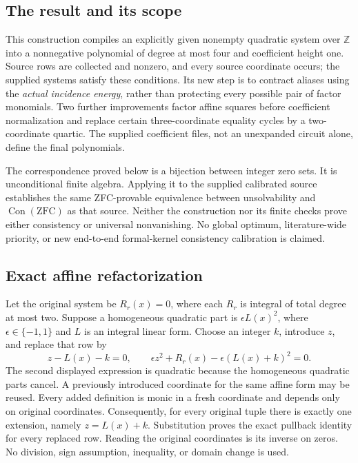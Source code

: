 \subsection{The result and its scope}
This construction compiles an explicitly given nonempty quadratic system over
\(\mathbb Z\) into a nonnegative polynomial of degree at most four and
coefficient height one. Source rows are collected and nonzero, and every
source coordinate occurs; the supplied systems satisfy these conditions. Its
new step is to contract aliases using the \emph{actual incidence energy},
rather than protecting every possible pair of factor monomials. Two further
improvements factor affine squares before coefficient normalization and
replace certain three-coordinate equality cycles by a two-coordinate
quartic. The supplied coefficient files, not an unexpanded circuit alone,
define the final polynomials.

The correspondence proved below is a bijection between integer zero sets.
It is unconditional finite algebra. Applying it to the supplied calibrated
source establishes the same ZFC-provable equivalence between unsolvability
and \(\operatorname{Con}(\mathrm{ZFC})\) as that source. Neither the
construction nor its finite checks prove either consistency or universal
nonvanishing. No global optimum, literature-wide priority, or new
end-to-end formal-kernel consistency calibration is claimed.

\subsection{Exact affine refactorization}
Let the original system be \(R_r(x)=0\), where each \(R_r\) is integral
of total degree at most two. Suppose a homogeneous quadratic part is
\(\epsilon L(x)^2\), where \(\epsilon\in\{-1,1\}\) and \(L\) is
an integral linear form. Choose an integer \(k\), introduce \(z\), and
replace that row by
\[
 z-L(x)-k=0,\qquad
 \epsilon z^2+R_r(x)-\epsilon(L(x)+k)^2=0.
\]
The second displayed expression is quadratic because the homogeneous
quadratic parts cancel. A previously introduced coordinate for the same
affine form may be reused. Every added definition is monic in a fresh
coordinate and depends only on original coordinates. Consequently, for
every original tuple there is exactly one extension, namely
\(z=L(x)+k\). Substitution proves the exact pullback identity for every
replaced row. Reading the original coordinates is its inverse on zeros.
No division, sign assumption, inequality, or domain change is used.

